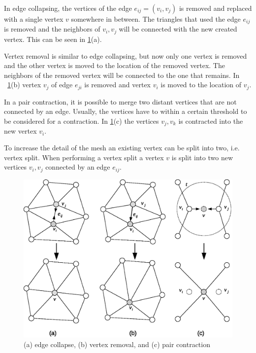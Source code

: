 In edge collapsing, the vertices of the edge $e_{ij} = (v_i, v_j)$ is removed and replaced with a single vertex $v$ somewhere in between. The triangles that used the edge $e_{ij}$ is removed and the neighbors of $v_i, v_j$ will be connected with the new created vertex. This can be seen in \cref{fig:mesh_transformations}(a).

Vertex removal is similar to edge collapsing, but now only one vertex is removed and the other vertex is moved to the location of the removed vertex. The neighbors of the removed vertex will be connected to the one that remains. In ~\cref{fig:mesh_transformations}(b) vertex $v_j$ of edge $e_{ji}$ is removed and vertex $v_i$ is moved to the location of $v_j$.

In a pair contraction, it is possible to merge two distant vertices that are not connected by an edge. Usually, the vertices have to within a certain threshold to be considered for a contraction. In \cref{fig:mesh_transformations}(c) the vertices $v_j, v_k$ is contracted into the new vertex $v_i$. 

To increase the detail of the mesh an existing vertex can be split into two, i.e. vertex split. When performing a vertex split a vertex $v$ is split into two new vertices $v_i, v_j$ connected by an edge $e_{ij}$. 

\begin{figure}[ht]
    \centering
    \includegraphics[width=\textwidth]{figures/mesh_transformations.eps}
    \caption{(a) edge collapse, (b) vertex removal, and (c) pair contraction}
    \label{fig:mesh_transformations}
\end{figure}
\fi %


